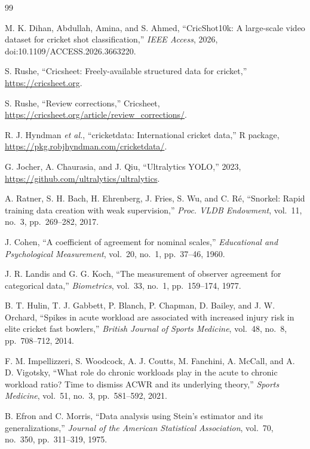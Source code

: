 \documentclass[11pt,a4paper]{article}
\begin{document}
\begin{thebibliography}{99}
\small

M. K. Dihan, Abdullah, Amina, and S. Ahmed, ``CricShot10k: A large-scale video
dataset for cricket shot classification,'' \emph{IEEE Access}, 2026,
doi:10.1109/ACCESS.2026.3663220.

S. Rushe, ``Cricsheet: Freely-available structured data for cricket,''
\url{https://cricsheet.org}.

S. Rushe, ``Review corrections,'' Cricsheet,
\url{https://cricsheet.org/article/review_corrections/}.

R. J. Hyndman \emph{et al.}, ``cricketdata: International cricket data,'' R
package, \url{https://pkg.robjhyndman.com/cricketdata/}.

G. Jocher, A. Chaurasia, and J. Qiu, ``Ultralytics YOLO,'' 2023,
\url{https://github.com/ultralytics/ultralytics}.

A. Ratner, S. H. Bach, H. Ehrenberg, J. Fries, S. Wu, and C. R\'e, ``Snorkel:
Rapid training data creation with weak supervision,'' \emph{Proc. VLDB
Endowment}, vol.~11, no.~3, pp.~269--282, 2017.

J. Cohen, ``A coefficient of agreement for nominal scales,'' \emph{Educational
and Psychological Measurement}, vol.~20, no.~1, pp.~37--46, 1960.

J. R. Landis and G. G. Koch, ``The measurement of observer agreement for
categorical data,'' \emph{Biometrics}, vol.~33, no.~1, pp.~159--174, 1977.

B. T. Hulin, T. J. Gabbett, P. Blanch, P. Chapman, D. Bailey, and J. W.
Orchard, ``Spikes in acute workload are associated with increased injury risk
in elite cricket fast bowlers,'' \emph{British Journal of Sports Medicine},
vol.~48, no.~8, pp.~708--712, 2014.

F. M. Impellizzeri, S. Woodcock, A. J. Coutts, M. Fanchini, A. McCall, and
A. D. Vigotsky, ``What role do chronic workloads play in the acute to chronic
workload ratio? Time to dismiss ACWR and its underlying theory,''
\emph{Sports Medicine}, vol.~51, no.~3, pp.~581--592, 2021.

B. Efron and C. Morris, ``Data analysis using Stein's estimator and its
generalizations,'' \emph{Journal of the American Statistical Association},
vol.~70, no.~350, pp.~311--319, 1975.


\end{thebibliography}
\end{document}
